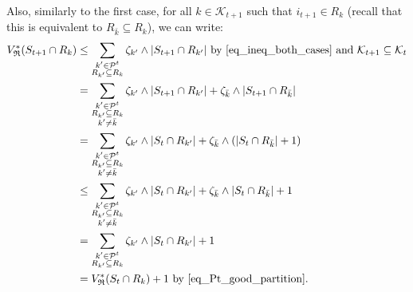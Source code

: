 \documentclass[
  11pt,
  a4paper,
]{article}
\theoremstyle{plain}
\theoremstyle{definition}
\theoremstyle{plain}
\theoremstyle{definition}
\theoremstyle{plain}
\theoremstyle{remark}
\begin{document}
Also, similarly to the first case, for all \(k\in\mathcal{K}_{t+1}\)
such that \(i_{t+1}\in R_k\) (recall that this is equivalent to
\(R_{\bar k}\subseteq R_k\)), we can write: \begin{align}
V^*_{\mathfrak{R}}(S_{t+1}\cap R_k)&\leq \sum_{\substack{k'\in\mathcal{P}^{t}\\R_{k'}\subseteq R_k}} \zeta_{k'}\wedge |S_{t+1}\cap R_{k'}| \text{ by \eqref{eq_ineq_both_cases} and }\mathcal{K}_{t+1}\subseteq\mathcal{K}_t\notag\\
&=\sum_{\substack{k'\in\mathcal{P}^{t}\\R_{k'}\subseteq R_k\\ k'\neq\bar k}} \zeta_{k'}\wedge |S_{t+1}\cap R_{k'}| + \zeta_{\bar k}\wedge |S_{t+1}\cap R_{\bar k}| \notag\\
&=\sum_{\substack{k'\in\mathcal{P}^{t}\\R_{k'}\subseteq R_k\\ k'\neq\bar k}} \zeta_{k'}\wedge |S_{t}\cap R_{k'}| + \zeta_{\bar k}\wedge( |S_{t}\cap R_{\bar k}| +1)\notag\\
&\leq \sum_{\substack{k'\in\mathcal{P}^{t}\\R_{k'}\subseteq R_k\\ k'\neq\bar k}} \zeta_{k'}\wedge |S_{t}\cap R_{k'}| + \zeta_{\bar k}\wedge|S_{t}\cap R_{\bar k}| +1\notag\\
&=\sum_{\substack{k'\in\mathcal{P}^{t}\\R_{k'}\subseteq R_k}} \zeta_{k'}\wedge |S_{t}\cap R_{k'}|  + 1\notag\\
&=V^*_{\mathfrak{R}}(S_t\cap R_k) +1  \text{ by \eqref{eq_Pt_good_partition}}.\label{eq_ineq_}
\end{align}
\end{document}
